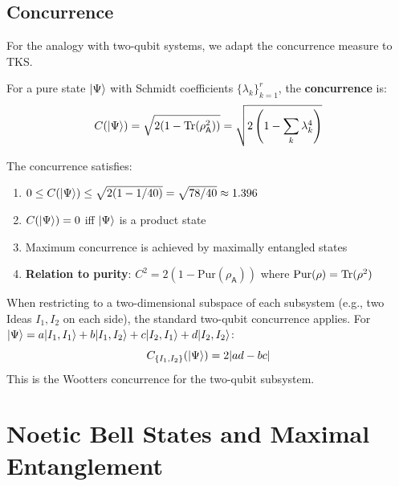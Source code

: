\subsection{Concurrence}

For the analogy with two-qubit systems, we adapt the concurrence measure to TKS.

\begin{definition}
\label{def:concurrence-pure}
For a pure state $|\Psi\rangle$ with Schmidt coefficients $\{\lambda_k\}_{k=1}^{r}$, the \textbf{concurrence} is:
\[
C(|\Psi\rangle) = \sqrt{2(1 - \mathrm{Tr}(\rho_\mathsf{A}^2))} = \sqrt{2\left(1 - \sum_k \lambda_k^4\right)}
\]
\end{definition}

\begin{proposition}
\label{prop:concurrence-props}
The concurrence satisfies:
\begin{enumerate}
  \item $0 \leq C(|\Psi\rangle) \leq \sqrt{2(1 - 1/40)} = \sqrt{78/40} \approx 1.396$
  \item $C(|\Psi\rangle) = 0$ iff $|\Psi\rangle$ is a product state
  \item Maximum concurrence is achieved by maximally entangled states
  \item \textbf{Relation to purity}: $C^2 = 2(1 - \mathrm{Pur}(\rho_\mathsf{A}))$ where $\mathrm{Pur}(\rho) = \mathrm{Tr}(\rho^2)$
\end{enumerate}
\end{proposition}

\begin{definition}
\label{def:concurrence-two-element}
When restricting to a two-dimensional subspace of each subsystem (e.g., two Ideas $I_1, I_2$ on each side), the standard two-qubit concurrence applies. For $|\Psi\rangle = a|I_1, I_1\rangle + b|I_1, I_2\rangle + c|I_2, I_1\rangle + d|I_2, I_2\rangle$:
\[
C_{\{I_1, I_2\}}(|\Psi\rangle) = 2|ad - bc|
\]
This is the Wootters concurrence for the two-qubit subsystem.
\end{definition}

\section{Noetic Bell States and Maximal Entanglement}
\label{sec:maximally-entangled}

